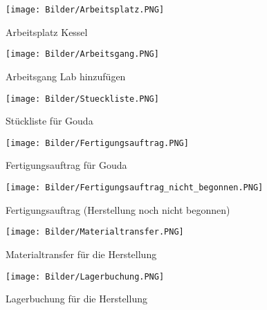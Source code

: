 \begin{figure}[H]
  \centering
  \texttt{[image: Bilder/Arbeitsplatz.PNG]}
  \caption{Arbeitsplatz \glqq Kessel\grqq}
  \label{fig:arbPlatz}
\end{figure}
\begin{figure}[H]
  \centering
  \texttt{[image: Bilder/Arbeitsgang.PNG]}
  \caption{Arbeitsgang \glqq Lab hinzufügen\grqq}
  \label{fig:arbGang}
\end{figure}
\begin{figure}[H]
  \centering
  \texttt{[image: Bilder/Stueckliste.PNG]}
  \caption{Stückliste für Gouda}
  \label{fig:stListe}
\end{figure}
\begin{figure}[H]
  \centering
  \texttt{[image: Bilder/Fertigungsauftrag.PNG]}
  \caption{Fertigungsauftrag für Gouda}
  \label{fig:fertAuftr}
\end{figure}
\begin{figure}[H]
  \centering
  \texttt{[image: Bilder/Fertigungsauftrag\_nicht\_begonnen.PNG]}
  \caption{Fertigungsauftrag (Herstellung noch nicht begonnen)}
  \label{fig:fertNichtBeg}
\end{figure}
\begin{figure}[H]
  \centering
  \texttt{[image: Bilder/Materialtransfer.PNG]}
  \caption{Materialtransfer für die Herstellung}
  \label{fig:matTransfer}
\end{figure}
\begin{figure}[H]
  \centering
  \texttt{[image: Bilder/Lagerbuchung.PNG]}
  \caption{Lagerbuchung für die Herstellung}
  \label{fig:lagBuchung}
\end{figure}


